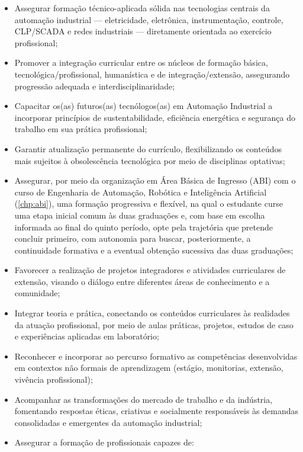 \begin{itemize}
    \item Assegurar formação técnico-aplicada sólida nas tecnologias centrais da automação industrial — eletricidade, eletrônica, instrumentação, controle, CLP/SCADA e redes industriais — diretamente orientada ao exercício profissional;
    \item Promover a integração curricular entre os núcleos de formação básica, tecnológica/profissional, humanística e de integração/extensão, assegurando progressão adequada e interdisciplinaridade;
    \item Capacitar os(as) futuros(as) tecnólogos(as) em Automação Industrial a incorporar princípios de sustentabilidade, eficiência energética e segurança do trabalho em sua prática profissional;
    \item Garantir atualização permanente do currículo, flexibilizando os conteúdos mais sujeitos à obsolescência tecnológica por meio de disciplinas optativas;
    \item Assegurar, por meio da organização em Área Básica de Ingresso (ABI) com o curso de Engenharia de Automação, Robótica e Inteligência Artificial (\autoref{chp:abi}), uma formação progressiva e flexível, na qual o estudante curse uma etapa inicial comum às duas graduações e, com base em escolha informada ao final do quinto período, opte pela trajetória que pretende concluir primeiro, com autonomia para buscar, posteriormente, a continuidade formativa e a eventual obtenção sucessiva das duas graduações;
    \item Favorecer a realização de projetos integradores e atividades curriculares de extensão, visando o diálogo entre diferentes áreas de conhecimento e a comunidade;
    \item Integrar teoria e prática, conectando os conteúdos curriculares às realidades da atuação profissional, por meio de aulas práticas, projetos, estudos de caso e experiências aplicadas em laboratório;
    \item Reconhecer e incorporar ao percurso formativo as competências desenvolvidas em contextos não formais de aprendizagem (estágio, monitorias, extensão, vivência profissional);
    \item Acompanhar as transformações do mercado de trabalho e da indústria, fomentando respostas éticas, criativas e socialmente responsáveis às demandas consolidadas e emergentes da automação industrial;
    \item Assegurar a formação de profissionais capazes de:
    \begin{itemize}

\end{itemize}
\end{itemize}
